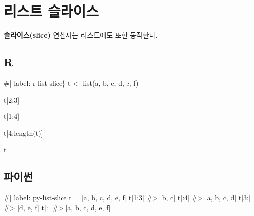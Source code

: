 \documentclass[
  letterpaper,
]{book}
\newenvironment{Shaded}{\begin{snugshade}}{\end{snugshade}}
\newcommand{\NormalTok}[1]{\textcolor[rgb]{0.00,0.23,0.31}{#1}}
\begin{document}
\section{리스트 슬라이스}\label{r-list-slice}

  
 

\textbf{슬라이스(slice)} 연산자는 리스트에도 또한 동작한다.

\subsection{R}

\begin{Shaded}
\begin{Highlighting}[]
\NormalTok{\#| label: r{-}list{-}slice\}}
\NormalTok{t \textless{}{-} list(\textquotesingle{}a\textquotesingle{}, \textquotesingle{}b\textquotesingle{}, \textquotesingle{}c\textquotesingle{}, \textquotesingle{}d\textquotesingle{}, \textquotesingle{}e\textquotesingle{}, \textquotesingle{}f\textquotesingle{})}

\NormalTok{t[2:3]}

\NormalTok{t[1:4]}

\NormalTok{t[4:length(t)]}

\NormalTok{t}
\end{Highlighting}
\end{Shaded}

\subsection{파이썬}

\begin{Shaded}
\begin{Highlighting}[]
\NormalTok{\#| label: py{-}list{-}slice}
\NormalTok{t = [\textquotesingle{}a\textquotesingle{}, \textquotesingle{}b\textquotesingle{}, \textquotesingle{}c\textquotesingle{}, \textquotesingle{}d\textquotesingle{}, \textquotesingle{}e\textquotesingle{}, \textquotesingle{}f\textquotesingle{}]}
\NormalTok{t[1:3]}
\NormalTok{\#\textgreater{} [\textquotesingle{}b\textquotesingle{}, \textquotesingle{}c\textquotesingle{}]}
\NormalTok{ t[:4]}
\NormalTok{\#\textgreater{} [\textquotesingle{}a\textquotesingle{}, \textquotesingle{}b\textquotesingle{}, \textquotesingle{}c\textquotesingle{}, \textquotesingle{}d\textquotesingle{}]}
\NormalTok{t[3:]}
\NormalTok{\#\textgreater{} [\textquotesingle{}d\textquotesingle{}, \textquotesingle{}e\textquotesingle{}, \textquotesingle{}f\textquotesingle{}]}
\NormalTok{t[:]}
\NormalTok{\#\textgreater{} [\textquotesingle{}a\textquotesingle{}, \textquotesingle{}b\textquotesingle{}, \textquotesingle{}c\textquotesingle{}, \textquotesingle{}d\textquotesingle{}, \textquotesingle{}e\textquotesingle{}, \textquotesingle{}f\textquotesingle{}]}
\end{Highlighting}
\end{Shaded}
\end{document}
